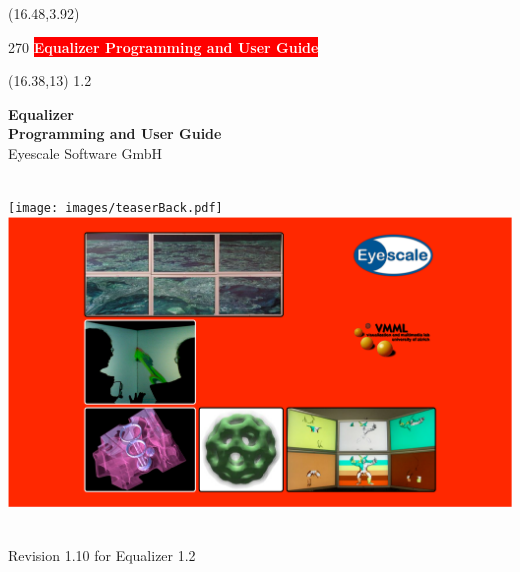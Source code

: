 \documentclass[10pt]{scrartcl}
\newcommand{\boxwidth}{5in}
\newcommand{\spacewidth}{621pt}
\newcommand{\spinewidth}{19.264pt}
\begin{document}
\thispagestyle{empty}

\begin{textblock}{}(16.48,3.92)
  \begin{rotate}{270}
    \setlength{\fboxsep}{9.4pt} 
    \colorbox{red}{\textsf{\bfseries\Large\textcolor{white}{{\hspace{38pt}Equalizer
            Programming and User Guide\hspace{38pt}}}}}
  \end{rotate}
\end{textblock}

\begin{textblock}{}(16.38,13)
  {\large 1.2}
\end{textblock}

\parbox[t]{\spacewidth}{\hfill}
\parbox[t]{\boxwidth}{
\vspace{-32pt}
  \center
  \textsf{\textbf{\huge Equalizer\\Programming and User Guide}}\\[\bigskipamount]
  {\Large Eyescale Software GmbH}\\
}\\
\vfill
\vspace{32pt}
\hspace{-128pt}
  \texttt{[image: images/teaserBack.pdf]}
  \hspace{\spinewidth}
  \includegraphics[width=\spacewidth]{images/teaser.pdf}
\\
\vfill
\parbox[t]{\spacewidth}{\hfill}
\parbox[t]{\boxwidth}{ \\\vspace{1cm}
  {\Large Revision 1.10 for Equalizer 1.2}\\[\medskipamount]
}
\end{document}
